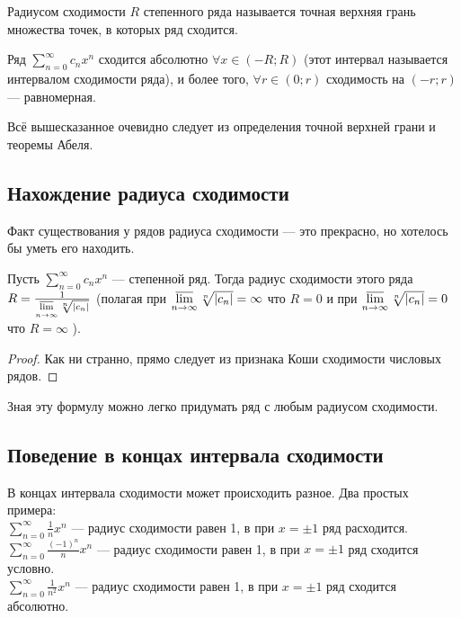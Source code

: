 \documentclass[a4paper, 12pt]{article}
\begin{document}
\begin{Def}
	Радиусом сходимости $R$ степенного ряда  называется точная верхняя грань множества точек, в которых ряд сходится.
\end{Def}


\begin{Consequence}
	Ряд  $\sum\limits_{n = 0}^{\infty}c_n x^n$ сходится абсолютно $\forall x \in (-R; R)$ (этот интервал называется интервалом сходимости ряда), и более того, $\forall r \in (0; r)$ сходимость на $(-r; r)$ --- равномерная.
\end{Consequence}
Всё вышесказанное очевидно следует из определения точной верхней грани и теоремы Абеля.

\subsection{Нахождение радиуса сходимости}

Факт существования у рядов радиуса сходимости --- это прекрасно, но хотелось бы уметь его находить.


\begin{Theorem} 
	Пусть $\sum\limits_{n = 0}^{\infty}c_n x^n$  --- степенной ряд. Тогда радиус сходимости этого ряда $R= \frac{1}{\varlimsup\limits_{n \to \infty} \sqrt[n]{|c_n|}}$ (полагая при $\varlimsup\limits_{n \to \infty} \sqrt[n]{|c_n|} = \infty$ что $R = 0$ и при $\varlimsup\limits_{n \to \infty} \sqrt[n]{|c_n|} = 0$ что $R = \infty$ ).
\end{Theorem}
\begin{proof}
	Как ни странно, прямо следует из признака Коши сходимости числовых рядов.
	
\end{proof}

Зная эту формулу можно легко придумать ряд с любым радиусом сходимости.

\subsection{Поведение в концах интервала сходимости}

В концах интервала сходимости может происходить разное.
Два простых примера:
\\$\sum\limits_{n = 0}^{\infty}\frac{1}{n} x^n$ --- радиус сходимости равен 1, в при $x= \pm 1$ ряд расходится.
\\$\sum\limits_{n = 0}^{\infty}\frac{(-1)^n}{n} x^n$ --- радиус сходимости равен 1, в при $x= \pm 1$ ряд сходится условно.
\\$\sum\limits_{n = 0}^{\infty}\frac{1}{n^2} x^n$ --- радиус сходимости равен 1, в при $x= \pm 1$ ряд сходится абсолютно.
\end{document}
